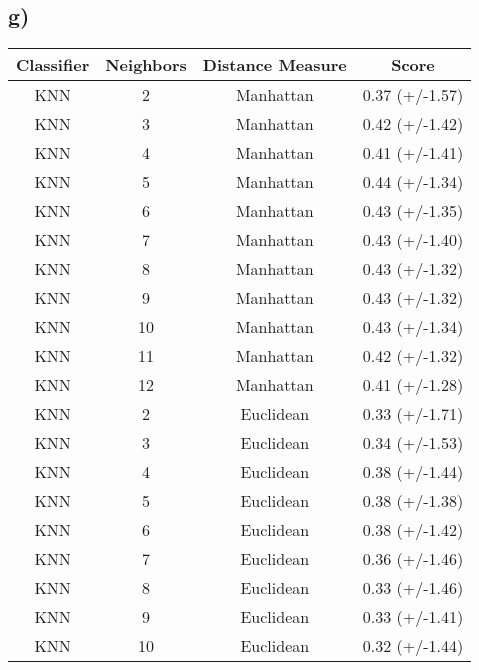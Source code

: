 \documentclass{article}
\begin{document}
        \subsection{g)}
          \begin{tabular}{cccc}
            \toprule
            Classifier &  Neighbors &    Distance Measure &    Score \\
            \midrule
            KNN &          2 &              Manhattan &  0.37 (+/-1.57) \\
            KNN &          3 &              Manhattan &  0.42 (+/-1.42) \\
            KNN &          4 &              Manhattan &  0.41 (+/-1.41) \\
            KNN &          5 &              Manhattan &  0.44 (+/-1.34) \\
            KNN &          6 &              Manhattan &  0.43 (+/-1.35) \\
            KNN &          7 &              Manhattan &  0.43 (+/-1.40) \\
            KNN &          8 &              Manhattan &  0.43 (+/-1.32) \\
            KNN &          9 &              Manhattan &  0.43 (+/-1.32) \\
            KNN &         10 &              Manhattan &  0.43 (+/-1.34) \\
            KNN &         11 &              Manhattan &  0.42 (+/-1.32) \\
            KNN &         12 &              Manhattan &  0.41 (+/-1.28) \\
            KNN &          2 &              Euclidean &  0.33 (+/-1.71) \\
            KNN &          3 &              Euclidean &  0.34 (+/-1.53) \\
            KNN &          4 &              Euclidean &  0.38 (+/-1.44) \\
            KNN &          5 &              Euclidean &  0.38 (+/-1.38) \\
            KNN &          6 &              Euclidean &  0.38 (+/-1.42) \\
            KNN &          7 &              Euclidean &  0.36 (+/-1.46) \\
            KNN &          8 &              Euclidean &  0.33 (+/-1.46) \\
            KNN &          9 &              Euclidean &  0.33 (+/-1.41) \\
            KNN &         10 &              Euclidean &  0.32 (+/-1.44) \\

\end{tabular}
\end{document}
